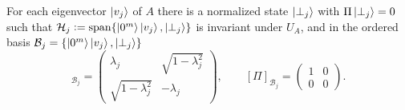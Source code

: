 \begin{lemma}
\label{lem:lec08-qubit}
For each eigenvector $\ket{v_j}$ of $A$ there is a normalized state
$\ket{\perp_j}$ with $\Pi\ket{\perp_j}=0$ such that
$\mathcal H_j\vcentcolon=\mathrm{span}\{\ket{0^m}\ket{v_j},\ket{\perp_j}\}$ is invariant
under $U_A$, and in the ordered basis $\mathcal B_j=\{\ket{0^m}\ket{v_j},
\ket{\perp_j}\}$
\begin{equation}
  [U_A]_{\mathcal B_j}
  =\begin{pmatrix}\lambda_j&\sqrt{1-\lambda_j^2}\\[2pt]
    \sqrt{1-\lambda_j^2}&-\lambda_j\end{pmatrix},
  \qquad
  [\Pi]_{\mathcal B_j}=\begin{pmatrix}1&0\\0&0\end{pmatrix}.
  \label{eq:lec08-UBj}
\end{equation}
\end{lemma}

